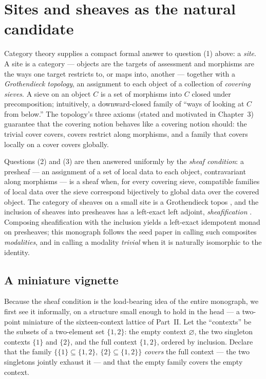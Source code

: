 \section{Sites and sheaves as the natural candidate}\label{ch01:sec:sites}

Category theory supplies a compact formal answer to question (1) above: a
\emph{site}. A site is a category --- objects are the targets of assessment
and morphisms are the ways one target restricts to, or maps into, another
--- together with a \emph{Grothendieck topology}, an assignment to each
object of a collection of \emph{covering sieves}. A sieve on an object $C$
is a set of morphisms into $C$ closed under precomposition; intuitively, a
downward-closed family of ``ways of looking at $C$ from below.'' The
topology's three axioms (stated and motivated in Chapter~3) guarantee that
the covering notion behaves like a covering notion should: the trivial cover
covers, covers restrict along morphisms, and a family that covers locally on
a cover covers globally.

Questions (2) and (3) are then answered uniformly by the \emph{sheaf
condition}: a presheaf --- an assignment of a set of local data to each
object, contravariant along morphisms --- is a sheaf when, for every
covering sieve, compatible families of local data over the sieve correspond
bijectively to global data over the covered object. The category of sheaves
on a small site is a Grothendieck topos \cite{maclane,johnstone}, and the
inclusion of sheaves into presheaves has a left-exact left adjoint,
\emph{sheafification} \cite{stacks00W1}. Composing sheafification with the
inclusion yields a left-exact idempotent monad on presheaves; this monograph
follows the seed paper in calling such composites \emph{modalities}, and in
calling a modality \emph{trivial} when it is naturally isomorphic to the
identity.

\subsection{A miniature vignette}\label{ch01:sec:vignette}

Because the sheaf condition is the load-bearing idea of the entire
monograph, we first see it informally, on a structure small
enough to hold in the head --- a two-point miniature of the sixteen-context
lattice of Part~II. Let the ``contexts'' be the subsets of a two-element
set $\{1, 2\}$: the empty context $\varnothing$, the two singleton contexts
$\{1\}$ and $\{2\}$, and the full context $\{1,2\}$, ordered by inclusion.
Declare that the family $\{ \{1\} \subseteq \{1,2\},\ \{2\} \subseteq
\{1,2\} \}$ \emph{covers} the full context --- the two singletons jointly
exhaust it --- and that the empty family covers the empty context.

